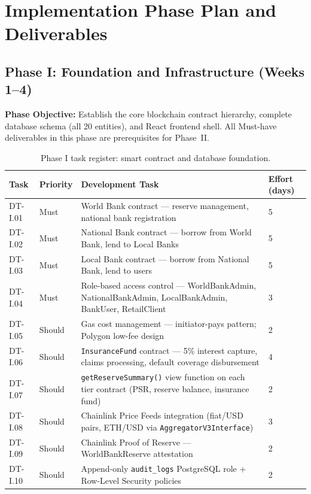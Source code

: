 \documentclass[12pt,a4paper]{report}
\newcommand{\tableheadcolor}{\rowcolor{TableHeadBg}}
\begin{document}
\section{Implementation Phase Plan and Deliverables}

\subsection{Phase I: Foundation and Infrastructure (Weeks 1--4)}

\textbf{Phase Objective:} Establish the core blockchain contract hierarchy,
complete database schema (all 20 entities), and React frontend shell.
All Must-have deliverables in this phase are prerequisites for Phase~II.

\begin{table}[H]
\centering
\caption[Phase I task register]{Phase I task register: smart contract and database foundation.%
\footnotemark}
\label{tab:phaseI-contracts}
\small
\begin{tabular}{p{1.8cm}p{1.8cm}p{7.5cm}p{1.5cm}}
\toprule
\tableheadcolor
\textbf{Task} & \textbf{Priority} & \textbf{Development Task} & \textbf{Effort (days)} \\
\midrule
DT-I.01 & Must & World Bank contract --- reserve management, national bank registration & 5 \\
DT-I.02 & Must & National Bank contract --- borrow from World Bank, lend to Local Banks & 5 \\
DT-I.03 & Must & Local Bank contract --- borrow from National Bank, lend to users & 5 \\
DT-I.04 & Must & Role-based access control --- WorldBankAdmin, NationalBankAdmin, LocalBankAdmin, BankUser, RetailClient & 3 \\
DT-I.05 & Should & Gas cost management --- initiator-pays pattern; Polygon low-fee design & 2 \\
DT-I.06 & Should & \texttt{InsuranceFund} contract --- 5\% interest capture, claims processing, default coverage disbursement & 4 \\
DT-I.07 & Should & \texttt{getReserveSummary()} view function on each tier contract (PSR, reserve balance, insurance fund) & 2 \\
DT-I.08 & Should & Chainlink Price Feeds integration (fiat/USD pairs, ETH/USD via \texttt{AggregatorV3Interface}) & 3 \\
DT-I.09 & Should & Chainlink Proof of Reserve --- WorldBankReserve attestation & 2 \\
DT-I.10 & Should & Append-only \texttt{audit\_logs} PostgreSQL role + Row-Level Security policies & 2 \\

\end{tabular}
\end{table}
\end{document}
